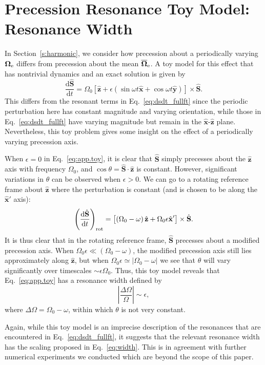 \documentclass[
        twocolumn,
        twocolappendix
    ]{aastex63}
\newcommand*{\rd}[2]{\frac{\mathrm{d}#1}{\mathrm{d}#2}}
\newcommand*{\abs}[1]{\left|#1\right|}
\renewcommand*{\bm}[1]{\boldsymbol{\mathbf{#1}}}
\newcommand*{\uv}[1]{\hat{\bm{#1}}}
\newcommand*{\p}[1]{\left(#1\right)}
\newcommand*{\s}[1]{\left[#1\right]}
\begin{document}
\section{Precession Resonance Toy Model: Resonance Width}\label{app:width}

In Section~\ref{s:harmonic}, we consider how precession about a periodically
varying $\bm{\Omega}_{\rm e}$ differs from precession about the mean
$\overline{\bm{\Omega}}_{\rm e}$. A toy model for this effect that has
nontrivial dynamics and an exact solution is given by
\begin{equation}
    \rd{\uv{S}}{t} = \Omega_0 \s{\uv{z} + \epsilon
        \p{\sin \omega t \uv{x} + \cos \omega t \uv{y}}} \times \uv{S}.
        \label{eq:app.toy}
\end{equation}
This differs from the resonant terms in Eq.~\eqref{eq:dsdt_fullft} since the
periodic perturbation here has constant magnitude and varying orientation, while
those in Eq.~\eqref{eq:dsdt_fullft} have varying magnitude but remain in the
$\uv{x}$-$\uv{z}$ plane. Nevertheless, this toy problem gives some insight on
the effect of a periodically varying precession axis.

When $\epsilon = 0$ in Eq.~\eqref{eq:app.toy}, it is clear that $\uv{S}$ simply
precesses about the $\uv{z}$ axis with frequency $\Omega_0$, and $\cos \theta =
\uv{S} \cdot \uv{z}$ is constant. However, significant variations in $\theta$
can be observed when $\epsilon > 0$. We can go to a rotating reference frame
about $\uv{z}$ where the perturbation is constant (and is chosen to be along the
$\uv{x}'$ axis):
\begin{equation}
    \p{\rd{\uv{S}}{t}}_{\rm rot} = \s{\p{\Omega_0 - \omega}\uv{z}
        + \Omega_0 \epsilon \uv{x}'} \times \uv{S}.
\end{equation}
It is thus clear that in the rotating reference frame, $\uv{S}$ precesses about
a modified precession axis. When $\Omega_0 \epsilon \ll \p{\Omega_0 - \omega}$,
the modified precession axis still lies approximately along $\uv{z}$, but when
$\Omega_0 \epsilon \simeq \abs{\Omega_0 - \omega}$ we see that $\theta$ will
vary significantly over timescales $\sim \epsilon \Omega_0$. Thus, this toy
model reveals that Eq.~\eqref{eq:app.toy} has a resonance width defined by
\begin{equation}
    \abs{\frac{\Delta \Omega}{\Omega}} \sim \epsilon,\label{eq:app.width}
\end{equation}
where $\Delta \Omega = \Omega_0 - \omega$, within which $\theta$ is not very
constant.

Again, while this toy model is an imprecise description of the resonances that
are encountered in Eq.~\eqref{eq:dsdt_fullft}, it suggests that the relevant
resonance width has the scaling proposed in Eq.~\eqref{eq:width}. This is in
agreement with further numerical experiments we conducted which are beyond the
scope of this paper.
\end{document}
